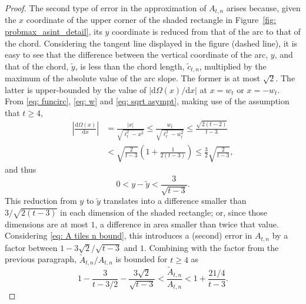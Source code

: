 \documentclass[12pt, a4paper]{article}
\newcommand{\diff}{\mathrm d}
\newcommand{\len}{\ell} %
\newcommand{\tiles}{t} %
\newcommand{\funcirc}{\Omega}
\begin{document}
\begin{proof}
The second type of error in the approximation of $A_{\tiles,n}$ arises because, given the $x$ coordinate of the upper corner of the shaded rectangle in Figure~\ref{fig: probmax_asint_detail}, its $y$ coordinate is reduced from that of the arc to that of the chord. Considering the tangent line displayed in the figure (dashed line), it is easy to see that the difference between the vertical coordinate of the arc, $y$, and that of the chord, $\tilde y$, is less than the chord length, $\tilde c_{\tiles,n}$, multiplied by the maximum of the absolute value of the arc slope. The former is at most $\sqrt{2}$. The latter is upper-bounded by the value of $|\diff \funcirc(x)/\diff x|$ at $x=w_\tiles$ or $x=-w_\tiles$. From \eqref{eq: funcirc}, \eqref{eq: w} and \eqref{eq: sqrt asympt}, making use of the assumption that $\tiles \geq 4$,
\begin{equation}
\label{eq: asympt slope bound}
\begin{split}
\left| \frac{\diff \funcirc(x)}{\diff x} \right| &= \frac{|x|}{\sqrt{\len_\tiles^2-x^2}} \leq \frac{w_\tiles}{\sqrt{\len_\tiles^2-w_\tiles^2}} \leq \frac{\sqrt{2(\tiles-2)}}{\tiles-3} \\
& < \sqrt{\frac 2 {\tiles-3}} \left(1 + \frac 1 {2(\tiles-3)} \right) \leq \frac 3 2 \sqrt{\frac 2 {\tiles-3}},
\end{split}
\end{equation}
and thus
\begin{equation}
\label{eq: y: arc - chord}
0 < y - \tilde y < \frac 3 {\sqrt{\tiles-3}}.
\end{equation}
This reduction from $y$ to $\tilde y$ translates into a difference smaller than $3 / \sqrt{2(\tiles-3)}$ in each dimension of the shaded rectangle; or, since those dimensions are at most $1$, a difference in area smaller than twice that value. Considering \eqref{eq: A tiles n bound}, this introduces a (second) error in $A_{\tiles,n}$ by a factor between $1-3\sqrt{2}/\sqrt{\tiles-3}$ and $1$. Combining with the factor from the previous paragraph, $\tilde A_{\tiles,n} / A_{\tiles,n}$ is bounded for $\tiles \geq 4$ as
\begin{equation}
\label{eq: tilde A bound}
1 - \frac {3} {\tiles-3/2} - \frac{3\sqrt{2}} {\sqrt{\tiles-3}} < \frac{\tilde A_{\tiles,n}}{A_{\tiles,n}} < 1+\frac {21/4} {\tiles-3}.
\end{equation}


\end{proof}
\end{document}
